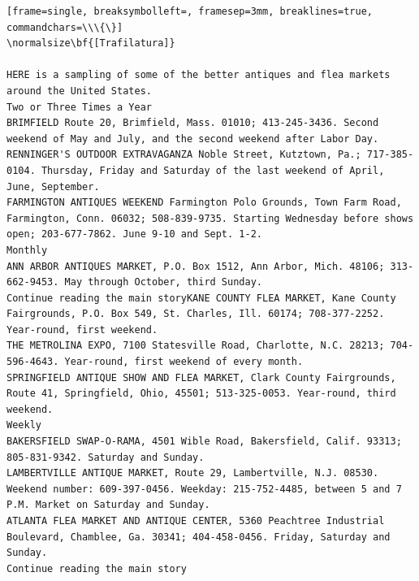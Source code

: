 \documentclass{article}
\begin{document}
\begin{tiny}
\begin{Verbatim}[frame=single, breaksymbolleft=, framesep=3mm, breaklines=true, commandchars=\\\{\}]
\normalsize\bf{[Trafilatura]}

HERE is a sampling of some of the better antiques and flea markets around the United States.
Two or Three Times a Year
BRIMFIELD Route 20, Brimfield, Mass. 01010; 413-245-3436. Second weekend of May and July, and the second weekend after Labor Day.
RENNINGER'S OUTDOOR EXTRAVAGANZA Noble Street, Kutztown, Pa.; 717-385-0104. Thursday, Friday and Saturday of the last weekend of April, June, September.
FARMINGTON ANTIQUES WEEKEND Farmington Polo Grounds, Town Farm Road, Farmington, Conn. 06032; 508-839-9735. Starting Wednesday before shows open; 203-677-7862. June 9-10 and Sept. 1-2.
Monthly
ANN ARBOR ANTIQUES MARKET, P.O. Box 1512, Ann Arbor, Mich. 48106; 313-662-9453. May through October, third Sunday.
Continue reading the main storyKANE COUNTY FLEA MARKET, Kane County Fairgrounds, P.O. Box 549, St. Charles, Ill. 60174; 708-377-2252. Year-round, first weekend.
THE METROLINA EXPO, 7100 Statesville Road, Charlotte, N.C. 28213; 704-596-4643. Year-round, first weekend of every month.
SPRINGFIELD ANTIQUE SHOW AND FLEA MARKET, Clark County Fairgrounds, Route 41, Springfield, Ohio, 45501; 513-325-0053. Year-round, third weekend.
Weekly
BAKERSFIELD SWAP-O-RAMA, 4501 Wible Road, Bakersfield, Calif. 93313; 805-831-9342. Saturday and Sunday.
LAMBERTVILLE ANTIQUE MARKET, Route 29, Lambertville, N.J. 08530. Weekend number: 609-397-0456. Weekday: 215-752-4485, between 5 and 7 P.M. Market on Saturday and Sunday.
ATLANTA FLEA MARKET AND ANTIQUE CENTER, 5360 Peachtree Industrial Boulevard, Chamblee, Ga. 30341; 404-458-0456. Friday, Saturday and Sunday.
Continue reading the main story
\end{Verbatim}
\end{tiny}
\end{document}
